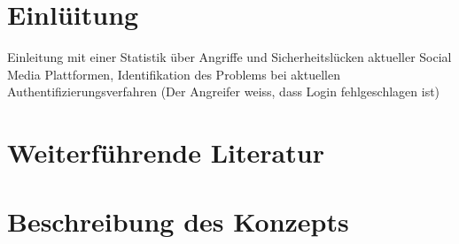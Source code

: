 \documentclass{sigchi}
\def\plainkeywords{Authors' choice; of terms; separated; by
  semicolons; include commas, within terms only; required.}
\begin{document}
%

\section{Einlüitung}
Einleitung mit einer Statistik über Angriffe und Sicherheitslücken aktueller Social Media Plattformen, Identifikation des Problems bei aktuellen Authentifizierungsverfahren (Der Angreifer weiss, dass Login fehlgeschlagen ist)

\section{Weiterführende Literatur}

 
\section{Beschreibung des Konzepts}
\end{document}
